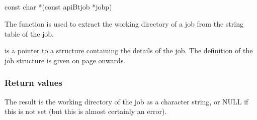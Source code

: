 \subsection{\funcnameXBgetdirect{}}

\begin{expara}

const char *\funcnameXBgetdirect{}(const apiBtjob *jobp)

\end{expara}

The function \funcXBgetdirect{} is used to extract the
working directory of a job from the string table of the job.

 is a pointer to a structure containing the
details of the job. The definition of the job structure is given on
page \pageref{bkm:Jobstructure} onwards.

\subsubsection{Return values}
The result is the working directory of the job as a
 character string, or NULL if this is not set
(but this is almost certainly an error).

